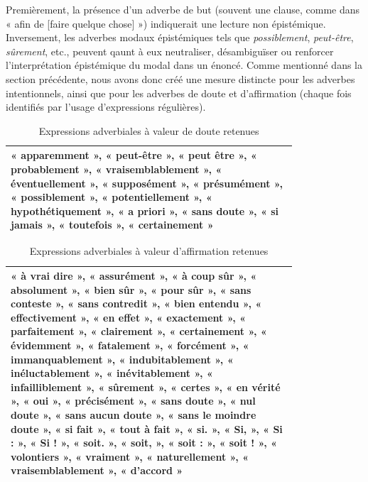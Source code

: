 Premièrement, la présence d'un adverbe de but (souvent une clause, comme dans « afin de [faire quelque chose] ») indiquerait une lecture non épistémique. Inversement, les adverbes modaux épistémiques tels que \textit{possiblement}, \textit{peut-être}, \textit{sûrement}, etc., peuvent qaunt à eux neutraliser, désambiguïser ou renforcer l'interprétation épistémique du modal dans un énoncé. Comme mentionné dans la section précédente, nous avons donc créé une mesure distincte pour les adverbes intentionnels, ainsi que pour les adverbes de doute et d'affirmation (chaque fois identifiés par l'usage d'expressions régulières).

\vspace{-40pt}

\begin{table}[H]
\caption{Expressions adverbiales à valeur de doute retenues}
\centering
\bigskip
\renewcommand{\arraystretch}{1.5} %
\begin{tabular}{|p{0.8\linewidth}|}
    \hline
    « apparemment », « peut-être », « peut être », « probablement », 
    « vraisemblablement », 
    « éventuellement »,
    « supposément »,
    « présumément »,
    « possiblement »,
    « potentiellement »,
    « hypothétiquement »,
    « a priori », 
    « sans doute », 
    « si jamais »,
    « toutefois », 
    « certainement »   \\
    \hline
\end{tabular}
 \label{Tab:adv_doute}
\end{table}

\begin{table}[H]
\caption{Expressions adverbiales à valeur d'affirmation retenues}
\centering
\bigskip
\renewcommand{\arraystretch}{1.5} %
\begin{tabular}{|p{0.8\linewidth}|}
    \hline
    « à vrai dire », « assurément », 
    « à coup sûr »,
    « absolument »,
    « bien sûr »,
    « pour sûr »,
    « sans conteste »,
    « sans contredit »,
    « bien entendu »,
    « effectivement », 
    « en effet »,
    « exactement »,
    « parfaitement »,
    « clairement »,
    « certainement »,
    « évidemment »,
    « fatalement »,
    « forcément »,
    « immanquablement »,
    « indubitablement »,
    « inéluctablement »,
    « inévitablement »,
    « infailliblement »,
    « sûrement »,
    « certes », 
    « en vérité », 
    « oui »,
    « précisément », 
    « sans doute », 
    « nul doute »,
    « sans aucun doute »,
    « sans le moindre doute »,
    « si fait », 
    « tout à fait »,
    « si. », « Si, », « Si : », « Si ! », 
    « soit. », « soit, », « soit : », « soit ! »,
    « volontiers », 
    « vraiment », 
    « naturellement », 
    « vraisemblablement »,
    « d'accord »   \\
    \hline
\end{tabular}
 \label{Tab:adv_affirmation}
\end{table}
\bigskip

